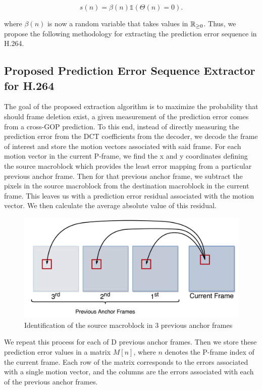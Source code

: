 \begin{equation}
s(n) = \beta(n) \mathds{1} \left( \Theta(n) = 0 \right).
\label{newModel}
\end{equation}

where $\beta(n)$ is now a random variable that takes values in $\operatorname*{\mathbb{R}}_{\geq 0}$. Thus, we propose the following methodology for extracting the prediction error sequence in H.264.

\subsection{Proposed Prediction Error Sequence Extractor for H.264}

The goal of the proposed extraction algorithm is to maximize the probability that should frame deletion exist, a given measurement of the prediction error comes from a cross-GOP prediction. To this end, instead of directly measuring the prediction error from the DCT coefficients from the decoder, we decode the frame of interest and store the motion vectors associated with said frame. For each motion vector in the current P-frame, we find the x and y coordinates defining the source macroblock which provides the least error mapping from a particular previous anchor frame. Then for that previous anchor frame, we subtract the pixels in the source macroblock from the destination macroblock in the current frame. This leaves us with a prediction error residual associated with the motion vector. We then calculate the average absolute value of this residual.

\begin{figure}[htbp]
\centerline{\includegraphics[width=0.9\linewidth]{ProposedApproach/id_source_mb.png}}
\caption{Identification of the source macroblock in 3 previous anchor frames}
\label{srcmbid}
\end{figure}

We repeat this process for each of D previous anchor frames. Then we store these prediction error values in a matrix $M[n]$, where $n$ denotes the P-frame index of the current frame. Each row of the matrix corresponds to the errors associated with a single motion vector, and the columns are the errors associated with each of the previous anchor frames.

